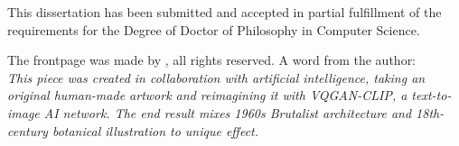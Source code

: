 
\vspace*{\fill}
\begin{center}
This dissertation has been submitted and accepted in partial fulfillment of
the requirements for the Degree of Doctor of Philosophy in
Computer Science.

\end{center}

\begin{center}

The frontpage was made by \href{https://www.unlimiteddreamco.xyz/}, all rights reserved.
A word from the author: \\
\textit{This piece was created in collaboration with artificial intelligence, taking an original human-made artwork and reimagining it with VQGAN-CLIP, a text-to-image AI network. The end result mixes 1960s Brutalist architecture and 18th-century botanical illustration to unique effect.}

\end{center}
\vspace*{\fill}
\vspace*{\fill}
\vspace*{\fill}
